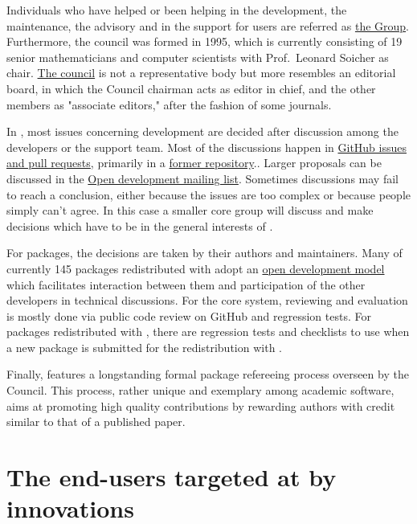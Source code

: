 \documentclass{deliverablereport}
\begin{document}
Individuals who have helped or been helping in the development, the
maintenance, the advisory and in the support for users are referred as
\href{https://www.gap-system.org/Contacts/People/people.html}{the \GAP
  Group}.  Furthermore, the \GAP council was formed in 1995, which is
currently consisting of 19 senior mathematicians and computer
scientists with Prof.~Leonard Soicher as
chair. \href{https://www.gap-system.org/Contacts/People/Council/council.html}{The
  \GAP council} is not a representative body but more resembles an
editorial board, in which the Council chairman acts as editor in
chief, and the other members as "associate editors," after
the fashion of some journals.

In \GAP, most issues concerning development are decided after
discussion among the developers or the support team. Most of the
discussions happen in \href{https://github.com/gap-system}{GitHub
  issues and pull requests}, primarily in a
\href{https://github.com/gap-system/gap}{former
  repository}.. Larger
proposals can be discussed in the
\href{http://mail.gap-system.org/mailman/listinfo/gap}{Open \GAP
  development mailing list}. Sometimes discussions may fail to reach a
conclusion, either because the issues are too complex or because
people simply can’t agree. In this case a smaller core group will
discuss and make decisions which have to be in the general interests
of \GAP.

For \GAP packages, the decisions are taken by their authors and
maintainers. Many of currently 145 packages redistributed with \GAP
adopt an \href{http://gap-packages.github.io/}{open development model}
which facilitates interaction between them and participation of the
other \GAP developers in technical discussions.  For the
core \GAP system, reviewing and evaluation is mostly done via public
code review on GitHub and regression tests. For \GAP packages
redistributed with \GAP, there are regression tests and checklists to
use when a new package is submitted for the redistribution with \GAP.

Finally, \GAP features a longstanding formal package refereeing process
overseen by the \GAP Council. This process, rather unique and exemplary
among academic software, aims at promoting high quality contributions
by rewarding authors with credit similar to that of a published paper.

\section{The end-users targeted at by innovations}
\end{document}
